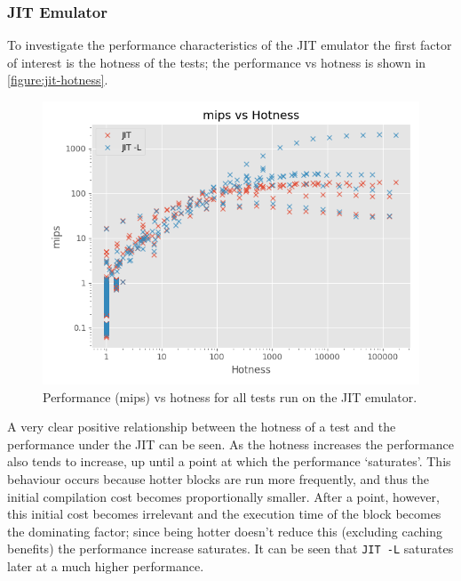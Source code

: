 \subsubsection{JIT Emulator}





To investigate the performance characteristics of the JIT emulator the first factor of interest is the hotness of the tests; the performance vs hotness is shown in \autoref{figure:jit-hotness}.

\begin{figure}[H]
    \centering
    \includegraphics[scale=0.75]{output/graphs/scatter/jit/hotness.png}
    \caption{Performance (mips) vs hotness for all tests run on the JIT emulator.}
    \label{figure:jit-hotness}
\end{figure}

A very clear positive relationship between the hotness of a test and the performance under the JIT can be seen. As the hotness increases the performance also tends to increase, up until a point at which the performance `saturates'. This behaviour occurs because hotter blocks are run more frequently, and thus the initial compilation cost becomes proportionally smaller. After a point, however, this initial cost becomes irrelevant and the execution time of the block becomes the dominating factor; since being hotter doesn't reduce this (excluding caching benefits) the performance increase saturates. It can be seen that \texttt{JIT -L} saturates later at a much higher performance.

